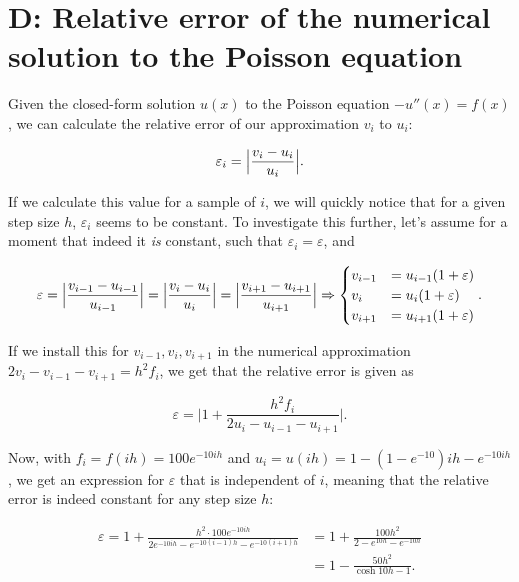 \documentclass[]{article}
\begin{document}
\section*{D: Relative error of the numerical solution to the Poisson equation}
Given the closed-form solution $u(x)$ to the Poisson equation $-u''(x) = f(x)$, we can calculate the relative error of our approximation $v_i$ to $u_i$:

\begin{equation*}
\varepsilon_{i} = \Bigl \lvert \frac{v_i - u_i}{u_i} \Bigr \rvert \text{.}
\end{equation*}

If we calculate this value for a sample of $i$, we will quickly notice that for a given step size $h$, $\varepsilon_i$ seems to be constant. To investigate this further, let's assume for a moment that indeed it \textit{is} constant, such that $\varepsilon_i = \varepsilon$, and

\begin{equation*}
\varepsilon = \Bigl \lvert \frac{v_{i-1} - u_{i-1}}{u_{i-1}} \Bigr \rvert = \Bigl \lvert \frac{v_{i} - u_{i}}{u_{i}} \Bigr \rvert = \Bigl \lvert \frac{v_{i+1} - u_{i+1}}{u_{i+1}} \Bigr \rvert \Rightarrow \begin{cases}
v_{i-1} &= u_{i-1}(1+\varepsilon) \\
v_{i} &= u_{i}(1+\varepsilon) \\
v_{i+1} &= u_{i+1}(1+\varepsilon)
\end{cases} \text{.}
\end{equation*}

If we install this for $v_{i-1},v_{i},v_{i+1}$ in the numerical approximation $2v_i - v_{i-1} - v_{i+1} = h^{2}f_i$, we get that the relative error is given as

\begin{equation*}
\varepsilon = \Biggl \lvert 1+ \frac{h^{2}f_i}{2u_i - u_{i-1} - u_{i+1}} \Biggr \rvert \text{.}
\end{equation*}

Now, with $f_i = f(ih) = 100e^{-10ih}$ and $u_i = u(ih) = 1 - (1 - e^{-10})ih - e^{-10ih}$, we get an expression for $\varepsilon$ that is independent of $i$, meaning that the relative error is indeed constant for any step size $h$:

\begin{equation}
\begin{split}
\label{eqn:eps-math}
\varepsilon = 1+ \frac{h^{2} \cdot 100e^{-10ih}}{2e^{-10ih} - e^{-10(i-1)h} - e^{-10(i+1)h}} &= 1+ \frac{100h^{2}}{2 - e^{10h} - e^{-10h}} \\&= 1 - \frac{50h^2}{\cosh 10h - 1} \text{.}
\end{split}
\end{equation}
\end{document}
